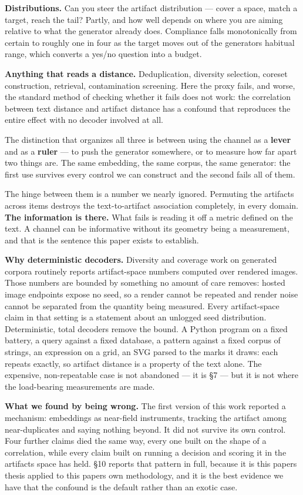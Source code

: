 \documentclass[
  10pt,
]{article}
\theoremstyle{plain}
\theoremstyle{definition}
\begin{document}
\textbf{Distributions.} Can you steer the artifact distribution ---
cover a space, match a target, reach the tail? Partly, and how well
depends on where you are aiming relative to what the generator already
does. Compliance falls monotonically from certain to roughly one in four
as the target moves out of the generator\textquotesingle s habitual
range, which converts a yes/no question into a budget.

\textbf{Anything that reads a distance.} Deduplication, diversity
selection, coreset construction, retrieval, contamination screening.
Here the proxy fails, and worse, the standard method of checking whether
it fails does not work: the correlation between text distance and
artifact distance has a confound that reproduces the entire effect with
no decoder involved at all.

The distinction that organizes all three is between using the channel as
a \textbf{lever} and as a \textbf{ruler} --- to push the generator
somewhere, or to measure how far apart two things are. The same
embedding, the same corpus, the same generator: the first use survives
every control we can construct and the second fails all of them.

The hinge between them is a number we nearly ignored. Permuting the
artifacts across items destroys the text-to-artifact association
completely, in every domain. \textbf{The information is there.} What
fails is reading it off a metric defined on the text. A channel can be
informative without its geometry being a measurement, and that is the
sentence this paper exists to establish.

\textbf{Why deterministic decoders.} Diversity and coverage work on
generated corpora routinely reports artifact-space numbers computed over
rendered images. Those numbers are bounded by something no amount of
care removes: hosted image endpoints expose no seed, so a render cannot
be repeated and render noise cannot be separated from the quantity being
measured. Every artifact-space claim in that setting is a statement
about an unlogged seed distribution. Deterministic, total decoders
remove the bound. A Python program on a fixed battery, a query against a
fixed database, a pattern against a fixed corpus of strings, an
expression on a grid, an SVG parsed to the marks it draws: each repeats
exactly, so artifact distance is a property of the text alone. The
expensive, non-repeatable case is not abandoned --- it is §7 --- but it
is not where the load-bearing measurements are made.

\textbf{What we found by being wrong.} The first version of this work
reported a mechanism: embeddings as near-field instruments, tracking the
artifact among near-duplicates and saying nothing beyond. It did not
survive its own control. Four further claims died the same way, every
one built on the shape of a correlation, while every claim built on
running a decision and scoring it in the artifact\textquotesingle s
space has held. §10 reports that pattern in full, because it is this
paper\textquotesingle s thesis applied to this paper\textquotesingle s
own methodology, and it is the best evidence we have that the confound
is the default rather than an exotic case.
\end{document}
